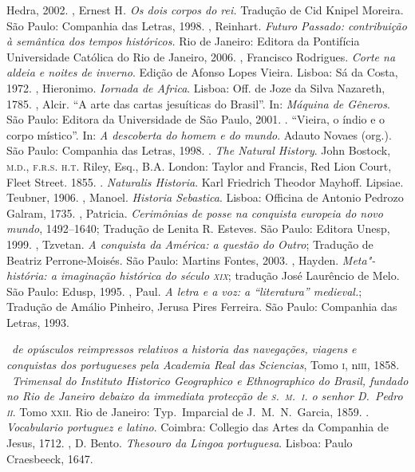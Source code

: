 \begin{bibliohedra}
Hedra, 2002.
, Ernest H\textit{. Os dois corpos do rei.} Tradução de Cid
Knipel Moreira. São Paulo: Companhia das Letras, 1998.
, Reinhart. \textit{Futuro Passado: contribuição à
semântica dos tempos históricos.}  Rio de Janeiro: Editora da
Pontifícia Universidade Católica do Rio de Janeiro, 2006.
, Francisco Rodrigues. \textit{Corte na aldeia e noites de inverno}.
Edição de Afonso Lopes Vieira. Lisboa: Sá da
Costa, 1972.
, Hieronimo. \textit{Iornada de Africa}.
Lisboa: Off. de Joze da Silva Nazareth, 1785.
, Alcir. ``A arte das cartas jesuíticas do Brasil''. In: \textit{Máquina de
Gêneros}. São Paulo: Editora da Universidade de São Paulo, 2001. 
\titidem. ``Vieira, o índio e o corpo místico''. In: \textit{A
descoberta do homem e do mundo}. Adauto Novaes (org.). São Paulo:
Companhia das Letras, 1998.
. \textit{The Natural History}. John Bostock, \textsc{m.d., f.r.s.
h.t.} Riley, Esq., B.A. London: Taylor and Francis, Red Lion Court,
Fleet Street. 1855.
\titidem. \textit{Naturalis Historia}. Karl Friedrich Theodor
Mayhoff. Lipsiae. Teubner, 1906.
, Manoel. \textit{Historia Sebastica}. Lisboa: Officina de Antonio Pedrozo Galram, 1735. 
, Patricia. \textit{Cerimônias de posse na conquista europeia do novo mundo}, 1492--1640; 
Tradução de Lenita R. Esteves. São Paulo: Editora
Unesp, 1999.
, Tzvetan. \textit{A conquista da América: a questão do Outro}; Tradução de 
Beatriz Perrone-Moisés. São Paulo: Martins Fontes, 2003.
, Hayden. \textit{Meta"-história: a imaginação histórica do século \textsc{xix}};
tradução José Laurêncio de Melo. São Paulo: Edusp, 1995.
, Paul. \textit{A letra e a voz: a ``literatura'' medieval.}; Tradução de Amálio
Pinheiro, Jerusa Pires Ferreira. São Paulo: Companhia das Letras, 1993.

\medskip
{}

\ \textit{de opúsculos reimpressos relativos a historia
das navegações, viagens e conquistas dos portugueses pela Academia Real
das Sciencias}, Tomo \textsc{i}, n\oi \textsc{iii}, 1858.
\ \textit{Trimensal do Instituto Historico Geographico e
Ethnographico do Brasil, fundado no Rio de Janeiro debaixo da immediata
protecção de \textsc{s.~m.~i.} o senhor D.~Pedro \textsc{ii}}. Tomo \textsc{xxii}. Rio de Janeiro:
Typ.~Imparcial de J.~M.~N.~Garcia, 1859.
. \textit{Vocabulario portuguez e latino}. Coimbra: Collegio das Artes da Companhia de
Jesus, 1712.
, D. Bento. \textit{Thesouro da Lingoa portuguesa}. Lisboa: Paulo Craesbeeck, 1647.
\end{bibliohedra}
